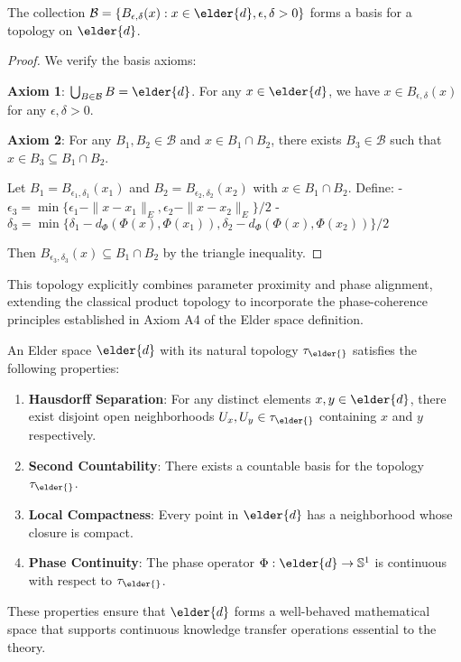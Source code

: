 \begin{theorem}
The collection $\mathcal{B} = \{B_{\epsilon, \delta}(x) : x \in \elder{d}, \epsilon, \delta > 0\}$ forms a basis for a topology on $\elder{d}$.
\end{theorem}

\begin{proof}
We verify the basis axioms:

\textbf{Axiom 1}: $\bigcup_{B \in \mathcal{B}} B = \elder{d}$. For any $x \in \elder{d}$, we have $x \in B_{\epsilon, \delta}(x)$ for any $\epsilon, \delta > 0$.

\textbf{Axiom 2}: For any $B_1, B_2 \in \mathcal{B}$ and $x \in B_1 \cap B_2$, there exists $B_3 \in \mathcal{B}$ such that $x \in B_3 \subseteq B_1 \cap B_2$.

Let $B_1 = B_{\epsilon_1, \delta_1}(x_1)$ and $B_2 = B_{\epsilon_2, \delta_2}(x_2)$ with $x \in B_1 \cap B_2$. Define:
- $\epsilon_3 = \min\{\epsilon_1 - \|x - x_1\|_E, \epsilon_2 - \|x - x_2\|_E\}/2$
- $\delta_3 = \min\{\delta_1 - d_{\Phi}(\Phi(x), \Phi(x_1)), \delta_2 - d_{\Phi}(\Phi(x), \Phi(x_2))\}/2$

Then $B_{\epsilon_3, \delta_3}(x) \subseteq B_1 \cap B_2$ by the triangle inequality.
\end{proof}

\begin{remark}
This topology explicitly combines parameter proximity and phase alignment, extending the classical product topology to incorporate the phase-coherence principles established in Axiom A4 of the Elder space definition.
\end{remark}

\begin{theorem}
An Elder space $\elder{d}$ with its natural topology $\tau_{\elder{}}$ satisfies the following properties:
\begin{enumerate}
    \item \textbf{Hausdorff Separation}: For any distinct elements $x, y \in \elder{d}$, there exist disjoint open neighborhoods $U_x, U_y \in \tau_{\elder{}}$ containing $x$ and $y$ respectively.
    
    \item \textbf{Second Countability}: There exists a countable basis for the topology $\tau_{\elder{}}$.
    
    \item \textbf{Local Compactness}: Every point in $\elder{d}$ has a neighborhood whose closure is compact.
    
    \item \textbf{Phase Continuity}: The phase operator $\Phi: \elder{d} \rightarrow \mathbb{S}^1$ is continuous with respect to $\tau_{\elder{}}$.
\end{enumerate}
These properties ensure that $\elder{d}$ forms a well-behaved mathematical space that supports continuous knowledge transfer operations essential to the theory.
\end{theorem}

